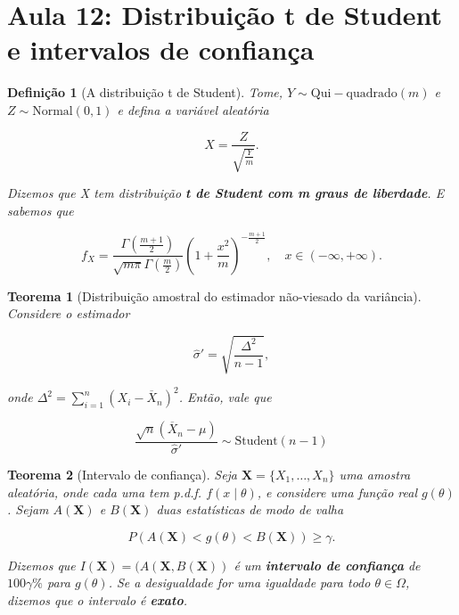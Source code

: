 \documentclass{article}
\newtheorem{theorem}{Teorema}
\newtheorem{definition}{Definição}
\begin{document}
\section*{Aula 12: Distribuição t de Student  e intervalos de confiança}
\label{s12}
\begin{definition}[A distribuição t de Student]
Tome, $Y \sim \mathrm{Qui-quadrado}(m)$ e $Z \sim \mathrm{Normal}(0, 1)$ e defina a variável aleatória

$$X = \frac{Z}{\sqrt{\frac{Y}{m}}}.$$

Dizemos que X tem distribuição \textbf{t de Student com m graus de liberdade}. E sabemos que

$$f_X = \frac{\Gamma(\frac{m + 1}{2})}{\sqrt{m \pi} \Gamma(\frac{m}{2})} \left ( 1 + \frac{x^2}{m} \right )^{-\frac{m + 1}{2}}, \quad x \in (-\infty, + \infty).$$
\end{definition}

\begin{theorem}[Distribuição amostral do estimador não-viesado da variância]

Considere o estimador

$$\hat{\sigma}' = \sqrt{\frac{\Delta^2}{n - 1}},$$

onde $\Delta^2 = \sum_{i = 1}^n (X_i - \overline{X}_n)^2$. Então, vale que

$$\frac{\sqrt{n} (\overline{X}_n - \mu)}{\hat{\sigma}'} \sim \mathrm{Student}(n - 1)$$
\end{theorem}

\begin{theorem}[Intervalo de confiança]
Seja $\textbf{X} = \{ X_1, \ldots, X_n \}$ uma amostra aleatória, onde cada uma tem p.d.f. $f(x \mid \theta)$, e considere uma função real $g(\theta)$. Sejam $A(\textbf{X})$ e $B(\textbf{X})$ duas estatísticas de modo de valha

\begin{equation}
    P(A(\textbf{X}) < g(\theta) < B(\textbf{X})) \geq \gamma.
\end{equation}

Dizemos que $I(\textbf{X}) = (A(\textbf{X},B(\textbf{X}))$ é um \textbf{intervalo de confiança} de $100 \gamma \%$ para $g(\theta)$. Se a desigualdade for uma igualdade para todo $\theta \in \Omega$, dizemos que o intervalo é \textbf{exato}.
\end{theorem}
\end{document}
